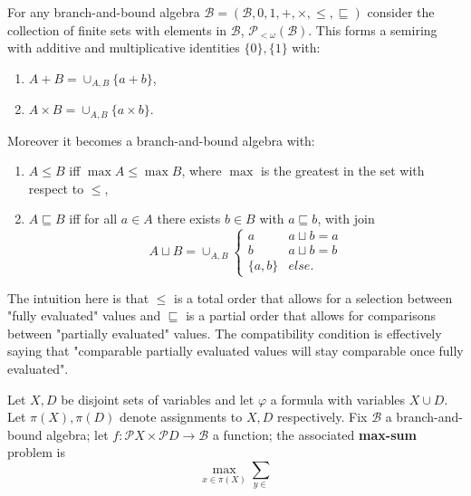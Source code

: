 \documentclass[acmsmall,review]{acmart}\settopmatter{printfolios=true,printccs=false,printacmref=false}
\begin{document}
\begin{example}
  For any branch-and-bound algebra $\mathcal B = (\mathcal B, 0, 1, +, \times, \leq, \sqsubseteq)$ consider the collection of finite sets with elements in $\mathcal B$, $\mathcal P_{<\omega} (\mathcal B)$. This forms a semiring with additive and multiplicative identities $\{0\}, \{1\}$ with:
  \begin{enumerate}
    \item $A + B = \cup_{A,B} \{a+b\}$,
    \item $A \times B = \cup_{A,B} \{a \times b\}$.
  \end{enumerate}
  Moreover it becomes a branch-and-bound algebra with:
  \begin{enumerate}
    \item $A \leq B$ iff $\max A \leq \max B$, where $\max$ is the greatest in the set with respect to $\leq$, 
    \item $A \sqsubseteq B$ iff for all $a \in A$ there exists $b \in B$ with $a \sqsubseteq b$, with join 
    \begin{equation}
      A \sqcup B = \cup_{A,B} \begin{cases}
        a & a \sqcup b = a \\ 
        b & a \sqcup b = b \\
        \{a,b\} & else.
      \end{cases}
    \end{equation}
  \end{enumerate}
\end{example}

The intuition here is that $\leq$ is a total order that allows for a selection between "fully evaluated" values and $\sqsubseteq$ is a partial order that allows for comparisons between "partially evaluated" values. The compatibility condition is effectively saying that "comparable partially evaluated values will stay comparable once fully evaluated".

\begin{definition}
  Let $X, D$ be disjoint sets of variables and let $\varphi$ a formula with variables $X \cup D$. Let $\pi(X), \pi(D)$ denote assignments to $X,D$ respectively. Fix $\mathcal B$ a branch-and-bound algebra; let $f : \mathcal P X \times \mathcal P D \to \mathcal B$ a function; the associated \textbf{max-sum} problem is
  \begin{equation}
    \max_{x \in \pi(X)} \sum_{y \in}
  \end{equation}
\end{definition}
\end{document}
